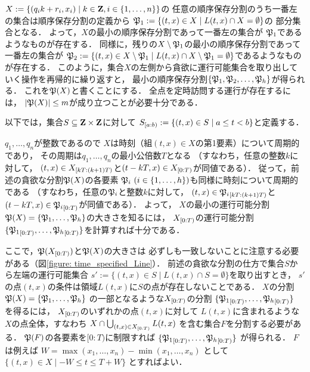 $X := \{ (q_i k + r_i, x_i) \mid k \in \mathbf Z, i \in \{1, \ldots, n\} \}$の
任意の順序保存分割のうち一番左の集合は順序保存分割の定義から
$\mathfrak{P}_1 := \{ (t, x) \in X \mid L(t, x) \cap X = \emptyset \}$の
部分集合となる．
よって，$X$の最小の順序保存分割であって一番左の集合が
$\mathfrak{P}_1$であるようなものが存在する．
%
同様に，残りの$X \setminus \mathfrak{P}_1$の最小の順序保存分割であって一番左の集合が
$\mathfrak{P}_2 :=
  \{ (t, x) \in X \setminus \mathfrak{P}_1
      \mid L(t, x) \cap X \setminus \mathfrak{P}_1 = \emptyset \}$であるようなものが存在する．
このように，集合$X$の左側から貪欲に運行可能集合を取り出していく操作を再帰的に繰り返すと，
最小の順序保存分割$\{ \mathfrak{P}_1, \mathfrak{P}_2, \ldots, \mathfrak{P}_h \}$が得られる．
これを$\mathfrak{P}(X)$と書くことにする．
全点を定時訪問する運行が存在するには，
$\lvert{\mathfrak{P}(X)}\rvert \leq m$が成り立つことが必要十分である．

以下では，集合$S \subseteq \mathbf Z \times \mathbf Z$に対して
${S}_{[a:b)} := \{ (t, x) \in S \mid a \leq t < b \}$と定義する．

$q_1, \ldots, q_n$が整数であるので
$X$は時刻（組$(t, x) \in X$の第1要素）について周期的であり，
その周期は$q_1, \ldots, q_n$の最小公倍数$T$となる
（すなわち，任意の整数$k$に対して，
$(t, x) \in {X}_{[kT:(k + 1)T)}$と$(t - kT, x) \in {X}_{[0:T)}$が同値である）．
従って，前述の貪欲な分割$\mathfrak{P}(X)$の各要素
$\mathfrak{P}_i\ (i \in \{1, \ldots, h \})$も同様に時刻について周期的である
（すなわち，任意の$\mathfrak{P}_i$と整数$k$に対して，
$(t, x) \in {\mathfrak{P}_i}_{[kT:(k + 1)T)}$と
$(t - kT, x) \in {\mathfrak{P}_i}_{[0:T)}$が同値である）．
%
よって，
$X$の最小の運行可能分割
$\mathfrak{P}(X) = \{ \mathfrak{P}_1, \ldots, \mathfrak{P}_h \}$の大きさを知るには，
${X}_{[0:T)}$の運行可能分割
$\{ {\mathfrak{P}_1}_{[0:T)}, \ldots, {\mathfrak{P}_h}_{[0:T)} \}$を計算すれば十分である．

ここで，$\mathfrak{P}({X}_{[0:T)})$と$\mathfrak{P}(X)$の大きさは
必ずしも一致しないことに注意する必要がある（図\ref{figure: time_specified_Line}）．
前述の貪欲な分割の仕方で集合$S$から左端の運行可能集合
$s' := \{ (t, x) \in S \mid L(t, x) \cap S = \emptyset \}$を取り出すとき，
$s'$の点$(t, x)$の条件は領域$L(t, x)$に$S$の点が存在しないことである．
$X$の分割$\mathfrak{P}(X) = \{ \mathfrak{P}_1, \ldots, \mathfrak{P}_h \}$%
の一部となるような${X}_{[0:T)}$の分割
$\{ {\mathfrak{P}_1}_{[0:T)}, \ldots, {\mathfrak{P}_h}_{[0:T)} \}$
を得るには，
${X}_{[0:T)}$のいずれかの点$(t, x)$に対して
$L(t, x)$に含まれるような$X$の点全体，すなわち
$X \cap \bigcup_{(t, x) \in {X}_{[0:T)}}L(t, x)$%
を含む集合$F$を分割する必要がある．
$\mathfrak{P}(F)$の各要素を$[0:T)$に制限すれば
$\{ {\mathfrak{P}_1}_{[0:T)}, \ldots, {\mathfrak{P}_h}_{[0:T)} \}$%
が得られる．
$F$は例えば
$W = \max(x_1, \ldots, x_n) - \min(x_1, \ldots, x_n)$%
として
$\{ (t, x) \in X \mid -W \leq t \leq T + W \}$%
とすればよい．


